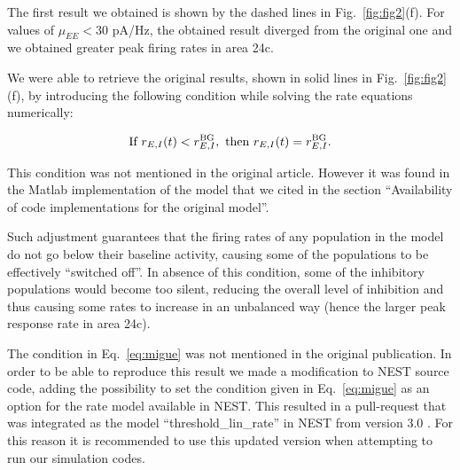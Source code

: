 The first result we obtained is shown by the dashed lines in Fig.~\ref{fig:fig2}(f). For values of $\mu_{EE} < 30$ pA/Hz, the obtained result diverged from the original one and we obtained greater peak firing rates in area 24c.

We were able to retrieve the original results, shown in solid lines in Fig.~\ref{fig:fig2}(f), by introducing the following condition while solving the rate equations numerically:

\begin{equation}
    \text{If } r_{E,I}(t) < r_{E,I}^{\rm BG}, \text{ then } r_{E,I}(t) = r_{E,I}^{\rm BG}.
    \label{eq:migue}
\end{equation}

This condition was not mentioned in the original article. However it was found in the Matlab implementation of the model that we cited in the section ``Availability of code implementations for the original model''.


Such adjustment guarantees that the firing rates of any population in the model do not go below their baseline activity, causing some of the populations to be effectively ``switched off''. In absence of this condition, some of the inhibitory populations would become too silent, reducing the overall level of inhibition and thus causing some rates to increase in an unbalanced way (hence the larger peak response rate in area 24c). 

The condition in Eq.~\ref{eq:migue} was not mentioned in the original publication. In order to be able to reproduce this result we made a modification to NEST source code, adding the possibility to set the condition given in Eq.~\ref{eq:migue} as an option for the rate model available in NEST. This resulted in a pull-request that was integrated as the model ``threshold\_lin\_rate'' in NEST from version 3.0 \cite{hahne_jan_2021_4739103}. For this reason it is recommended to use this updated version when attempting to run our simulation codes.


